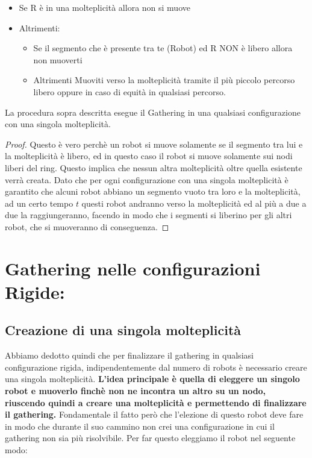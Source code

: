 \begin{itemize}
    \item Se R è in una molteplicità allora non si muove
    \item Altrimenti:
          \begin{itemize}
              \item Se il segmento che è presente tra te (Robot) ed R NON è libero
                    allora non muoverti
              \item Altrimenti Muoviti verso la molteplicità tramite il più piccolo
                    percorso libero oppure in caso di equità in qualsiasi percorso.
          \end{itemize}
\end{itemize}

\begin{lemma}
    La procedura sopra descritta esegue il Gathering in una
    qualsiasi configurazione con una singola molteplicità.
\end{lemma}

\begin{proof}
    Questo è vero perchè un robot si muove solamente se il segmento
    tra lui e la molteplicità è libero, ed in questo caso il robot si muove
    solamente sui nodi liberi del ring. Questo implica che nessun altra molteplicità
    oltre quella esistente verrà creata. Dato che per ogni configurazione con una
    singola molteplicità è garantito che alcuni robot abbiano un segmento vuoto tra
    loro e la molteplicità, ad un certo tempo $t$ questi robot andranno verso la
    molteplicità ed al più a due a due la raggiungeranno, facendo in modo che i
    segmenti si liberino per gli altri robot, che si muoveranno di conseguenza.
\end{proof}

\section{Gathering nelle configurazioni Rigide:}
\subsection{Creazione di una singola molteplicità}
Abbiamo dedotto quindi che per finalizzare il gathering in qualsiasi
configurazione rigida, indipendentemente dal numero di robots è necessario
creare una singola molteplicità. \textbf{L'idea principale è quella di eleggere
    un singolo robot e muoverlo finchè non ne incontra un altro su un nodo,
    riuscendo quindi a creare una molteplicità e permettendo di finalizzare il
    gathering.} Fondamentale il fatto però che l'elezione di questo robot deve fare
in modo che durante il suo cammino non crei una configurazione in cui il
gathering non sia più risolvibile. Per far questo eleggiamo il robot nel
seguente modo:\\

